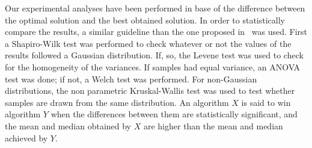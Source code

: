 Our experimental analyses have been performed in base of the difference between the optimal solution and the best obtained solution.
%
In order to statistically compare the results, a similar guideline than the one proposed in~\cite{Joel:StatisticalTest} was used. 
%
First a Shapiro-Wilk test was performed to check whatever or not the values of the results followed a Gaussian distribution. 
%
If, so, the Levene test was used to check for the homogeneity of the variances. 
%
If samples had equal variance, an ANOVA test was done; if not, a Welch test was performed. 
%
For non-Gaussian distributions, the non parametric Kruskal-Wallis test was used to test whether samples are drawn from the same distribution. 
%
An algorithm $X$ is said to win algorithm $Y$ when the differences between them are statistically significant, and the mean and median obtained by $X$ are higher 
than the mean and median achieved by $Y$.

